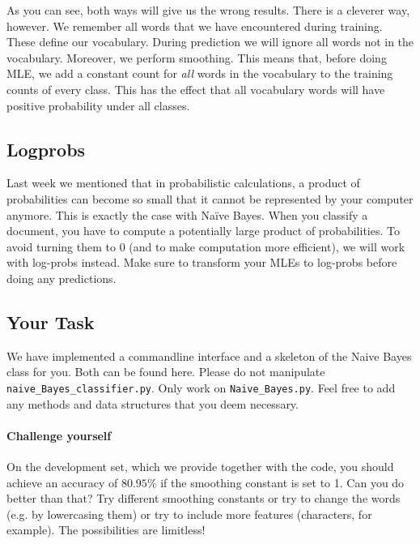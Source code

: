 \documentclass[11pt, leqno, a4paper]{article}
\begin{document}
As you can see, both ways will give us the wrong results. There is a cleverer way, however. We remember
all words that we have encountered during training. These define our vocabulary. During prediction we
will ignore all words not in the vocabulary. Moreover, we perform smoothing. This means that, before
doing MLE, we add a constant count for \textit{all} words in the vocabulary to the training counts
of every class. This has the effect that all vocabulary words will have positive probability under
all classes. 

\subsection{Logprobs}

Last week we mentioned that in probabilistic calculations, a product of probabilities can become so
small that it cannot be represented by your computer anymore. This is exactly the case with Na\"ive
Bayes. When you classify a document, you have to compute a potentially large product of probabilities.
To avoid turning them to 0 (and to make computation more efficient), we will work with log-probs
instead. Make sure to transform your MLEs to log-probs before doing any predictions.

\subsection{Your Task}
We have implemented a commandline interface and a skeleton of the Naive Bayes class for you. Both can be 
found here. Please do not manipulate \texttt{naive\_Bayes\_classifier.py}. Only work on 
\texttt{Naive\_Bayes.py}. Feel free to add any methods and data structures that you deem necessary.

\paragraph{Challenge yourself} On the development set, which we provide together with the code, you
should achieve an accuracy of $ 80.95\% $ if the smoothing constant is set to 1. Can you do better
than that? Try different smoothing constants or try to change the words (e.g. by lowercasing them) or
try to include more features (characters, for example). The possibilities are limitless! 
\end{document}
